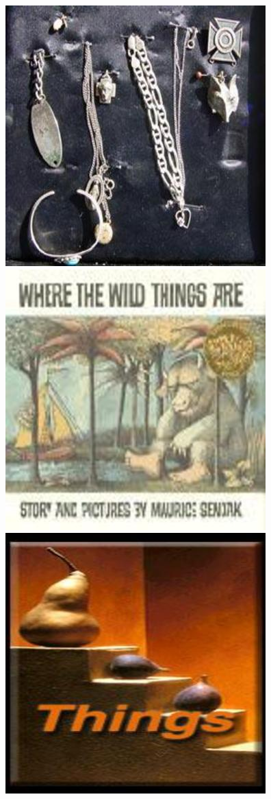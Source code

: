 \documentclass[oneside,a4paper,english,links,12pt]{article}
\begin{document}
\begin{figure}[htb]
\centering
\includegraphics[scale=0.20]{imagenes/image_0036}
\includegraphics[scale=0.20]{imagenes/image_0041}
\includegraphics[scale=0.20]{imagenes/image_0042}

\end{figure}
\end{document}
